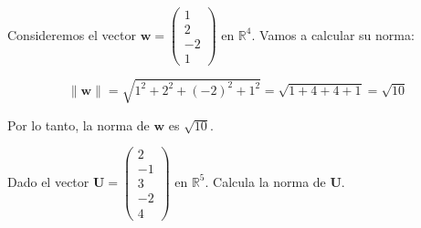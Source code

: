 \begin{example}
 Consideremos el vector $\mathbf{w} = \begin{pmatrix} 1 \\ 2 \\ -2 \\ 1 \end{pmatrix}$ en $\mathbb{R}^4$. Vamos a calcular su norma:

\[
\|\mathbf{w}\| = \sqrt{1^2 + 2^2 + (-2)^2 + 1^2} = \sqrt{1 + 4 + 4 + 1} = \sqrt{10}
\]

Por lo tanto, la norma de $\mathbf{w}$ es $\sqrt{10}$.   
\end{example}

\begin{exercise}
Dado el vector $\mathbf{U} = \begin{pmatrix} 2 \\ -1 \\ 3 \\ -2 \\ 4 \end{pmatrix}$ en $\mathbb{R}^5$. Calcula la norma de $\mathbf{U}$.
\end{exercise}
